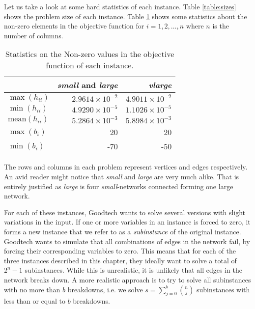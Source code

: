 Let us take a look at some hard statistics of each instance.
Table \ref{table:sizes} shows the problem size of each instance.
Table \ref{table:maxmin} shows some statistics about the non-zero elements in
the objective function for $i = 1,2,\ldots,n$ where $n$ is the number of
columns.
\begin{table}[ht!]
    \centering
    \caption{Statistics on the Non-zero values in the objective function of
each instance.}

    \begin{tabular}{lrr}
      & \textit{small} and \textit{large}         & \textit{vlarge} \\\hline
    $\max(h_{ii})$      & $2.9614 \times 10^{-2}$ & $4.9011 \times 10^{-2}$ \\
    $\min(h_{ii})$      & $4.9290 \times 10^{-5}$ & $1.1026 \times 10^{-5}$ \\
$\textrm{mean}(h_{ii})$ & $5.2864 \times 10^{-3}$ & $5.8984 \times 10^{-3}$ \\
    $\max(b_{i})$       & 20                      & 20 \\
    $\min(b_{i})$       & -70                     & -50 \\
    \end{tabular}
    \label{table:maxmin}
\end{table}
The rows and columns in each problem represent vertices and edges respectively.
An avid reader might notice that \textit{small} and \textit{large} are very
much alike.
That is entirely justified as \textit{large} is four \textit{small}-networks
connected forming one large network.

For each of these instances, Goodtech wants to solve several versions
with slight variations in the input.
If one or more variables in an instance is forced to zero, it forms a new
instance that we refer to as a $\emph{subinstance}$ of the original instance.
Goodtech wants to simulate that all combinations of edges in the network
fail, by forcing their corresponding variables to zero.
This means that for each of the three instances described in this chapter,
they ideally want to solve a total of $2^n - 1$ subinstances. While this is
unrealistic, it is unlikely that all edges in the network breaks down.
A more realistic approach is to try to solve all subinstances with no more than
$b$ breakdowns, i.e. we solve $s = \sum_{j=0}^b {\binom{n}{j}}$ subinstances
with less than or equal to $b$ breakdowns.
